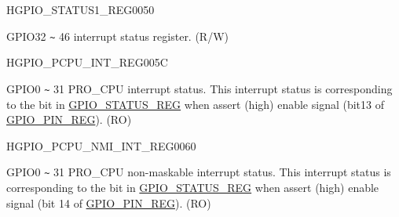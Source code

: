 \begin{register}{H}{GPIO\_STATUS1\_REG}{\hexprefix{}0050}\label{regdesc:GPIOSTATUS1REG}
%
%
\regnewline%
\begin{regdesc}\begin{reglist}
\label{fielddesc:GPIOSTATUS1INTERRUPT}\item [GPIO\_STATUS1\_INTERRUPT] GPIO32 \verb+~+ 46 interrupt status register. (R/W)
\end{reglist}\end{regdesc}
\end{register}


\begin{register}{H}{GPIO\_PCPU\_INT\_REG}{\hexprefix{}005C}\label{regdesc:GPIOPCPUINTREG}
%
\regnewline%
\begin{regdesc}\begin{reglist}
\label{fielddesc:GPIOPROCPUINT}\item [GPIO\_PROCPU\_INT] GPIO0 \verb+~+ 31 PRO\_CPU interrupt status. This interrupt status is corresponding to the bit in \hyperref[regdesc:GPIOSTATUSREG]{GPIO\_STATUS\_REG} when assert (high) enable signal (bit13 of \hyperref[regdesc:GPIOPINNREG]{GPIO\_PIN\_REG}). (RO)
\end{reglist}\end{regdesc}
\end{register}


\begin{register}{H}{GPIO\_PCPU\_NMI\_INT\_REG}{\hexprefix{}0060}\label{regdesc:GPIOPCPUNMIINTREG}
%
\regnewline%
\begin{regdesc}\begin{reglist}
\label{fielddesc:GPIOPROCPUNMIINT}\item [GPIO\_PROCPU\_NMI\_INT] GPIO0 \verb+~+ 31 PRO\_CPU non-maskable interrupt status. This interrupt status is corresponding to the bit in \hyperref[regdesc:GPIOSTATUSREG]{GPIO\_STATUS\_REG} when assert (high) enable signal (bit 14 of \hyperref[regdesc:GPIOPINNREG]{GPIO\_PIN\_REG}). (RO)
\end{reglist}\end{regdesc}
\end{register}




